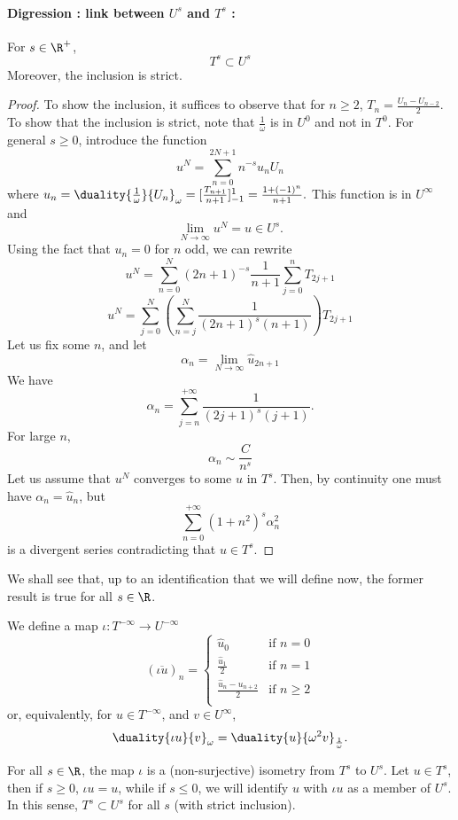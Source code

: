 \documentclass[]{article}
\begin{document}
\paragraph{Digression : link between $U^s$ and $T^s$ :}
\begin{Prop}
	For $s \in \R^+$, 
	\[T^s \subset U^s\] 
	Moreover, the inclusion is strict. 
	\begin{proof}
		To show the inclusion, it suffices to observe that for $n \geq 2$, $T_n = \frac{U_n - U_{n-2}}{2}$. 
		To show that the inclusion is strict, note that $\frac{1}{\omega}$ is in $U^0$ and not in $T^0$. For general $s \geq 0$, introduce the function 
		\[ u^N = \sum_{n=0}^{2N+1} n^{-s} u_n U_n\]
		where $u_n = \duality{\frac{1}{\omega}}{U_n}_\omega = [\frac{T_{n+1}}{n+1}]_{-1}^1 = \frac{1 + (-1)^n}{n+1}.$
		This function is in $U^{\infty}$ and 
		\[\lim_{N\to \infty}u^N = u \in U^s.\]
		Using the fact that $u_n = 0$ for $n$ odd, we can rewrite 
		\[u^N = \sum_{n=0}^{N}(2n+1)^{-s}\frac{1}{n + 1}\sum_{j=0}^{n}T_{2j + 1}\]
		\[u^N = \sum_{j = 0}^N \left( \sum_{n = j}^N \frac{1}{(2n+1)^s(n+1)} \right)T_{2j+1}\]
		Let us fix some $n$, and let  
		\[\alpha_{n} = \lim_{N \to \infty} \hat{u}_{2n+1}\]
		We have
		\[\alpha_n = \sum_{j = n}^{+ \infty}\frac{1}{(2j+1)^{s}(j+1)}.\]
		 For large $n$, 
		\[\alpha_n \sim \frac{C}{n^s}\]
		Let us assume that $u^N$ converges to some $u$ in $T^s$. Then, by continuity one must have $\alpha_n = \hat{u}_n$, but 
		\[\sum_{n=0}^{+\infty} (1 + n^2)^s\alpha_n^2\]
		is a divergent series contradicting that $u \in T^s$.  
	\end{proof}
\end{Prop}
We shall see that, up to an identification that we will define now, the former result is true for all $s \in \R$. 
\begin{Def}
	We define a map $\iota : T^{-\infty} \to U^{-\infty}$
	\[(\overline{\iota u})_n = \begin{cases}
	\hat{u}_0 & \text{if } n = 0\\
	\frac{\hat{u}_1}{2} & \text{if } n = 1\\
	\frac{\hat{u}_{n} - u_{n+2}}{2} & \text{if } n \geq 2\\
	\end{cases} \]
	or, equivalently, for $u \in T^{-\infty}$, and $v\in U^{\infty}$, 
	\[\duality{\iota u}{v}_\omega = \duality{u}{\omega^2 v}_\frac{1}{\omega}.\]
\end{Def}
\begin{Prop}
	For all $s \in \R$, the map $\iota$ is a (non-surjective) isometry from $T^s$ to $U^s$. Let $u \in T^s$, then if $s \geq 0$, $\iota u = u$, while if $s \leq 0$, we will identify $u$ with $\iota u$ as a member of $U^{s}$. In this sense, $T^s \subset U^s$ for all $s$ (with strict inclusion).  
\end{Prop}
\end{document}
